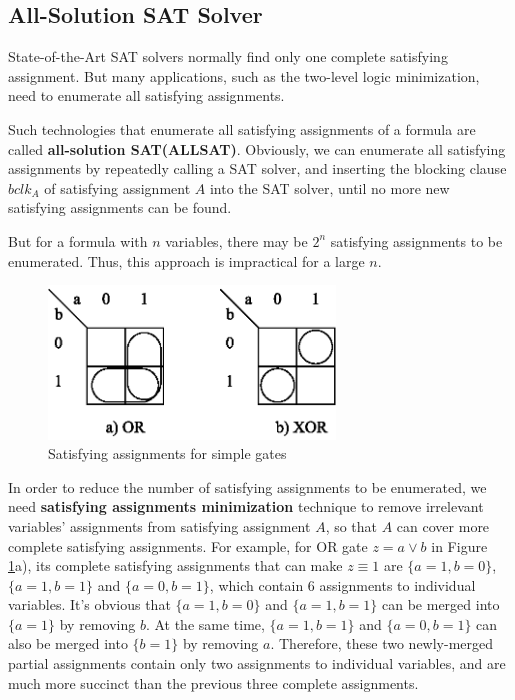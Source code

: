 \documentclass[journal]{IEEEtran}
\begin{document}
%
%


\subsection{All-Solution SAT Solver}\label{subsec_ALLSAT}

State-of-the-Art SAT solvers normally find only one complete satisfying assignment.
But many applications,
such as the two-level logic minimization\cite{SATLOGICMIN},
need to enumerate all satisfying assignments.

Such technologies that enumerate all satisfying assignments of a formula are called \textbf{all-solution SAT(ALLSAT)}.
Obviously,
we can enumerate all satisfying assignments by repeatedly calling a SAT solver,
and inserting the blocking clause $bclk_A$ of satisfying assignment $A$ into the SAT solver,
until no more new satisfying assignments can be found.

But for a formula with $n$ variables,
there may be $2^n$ satisfying assignments to be enumerated.
Thus, this approach is impractical for a large $n$.

\begin{figure}[!t]
\centering
\includegraphics[width=3in]{minterm}
\caption{Satisfying assignments for simple gates}
\label{ORXOR}
\end{figure}

In order to reduce the number of satisfying assignments to be enumerated,
we need \textbf{satisfying assignments minimization} technique to remove irrelevant variables' assignments from satisfying assignment $A$,
so that $A$ can cover more complete satisfying assignments.
For example, for OR gate $z= a\vee b$ in Figure \ref{ORXOR}a),
its complete satisfying assignments that can make $z\equiv 1$ are $\{a= 1, b= 0\}$,$\{a= 1, b= 1\}$ and $\{a= 0, b= 1\}$,
which contain 6 assignments to individual variables.
It's obvious that $\{a= 1, b= 0\}$ and $\{a= 1, b= 1\}$ can be merged into $\{a= 1\}$ by removing $b$.
At the same time,
$\{a= 1, b= 1\}$ and $\{a= 0, b= 1\}$ can also be merged into $\{b= 1\}$ by removing $a$.
Therefore,
these two newly-merged partial assignments contain only two assignments to individual variables,
and are much more succinct than the previous three complete assignments.
\end{document}
